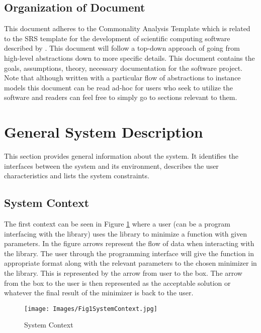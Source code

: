 \documentclass[12pt]{article}
\begin{document}
\subsection{Organization of Document}
This document adheres to the  Commonality Analysis Template which is related to the SRS template for the development of scientific computing software described by \citep{Ssmith}. This document will follow a top-down approach of going from high-level abstractions down to more specific details. This document contains the goals, assumptions, theory, necessary documentation for the software project. Note that although written with a particular flow of abstractions to instance models this document can be read ad-hoc for users who seek to utilize the software and readers can feel free to simply go to sections relevant to them. 
\\



\section{General System Description}
This section provides general information about the system.  It identifies the
interfaces between the system and its environment, describes the user
characteristics and lists the system constraints.
\\


\subsection{System Context}
The first context can be seen in Figure \ref{img:FigureSystemContext} where a user (can be a program interfacing with the library) uses the library to minimize a function with given parameters. In the figure arrows represent the flow of data when interacting with the library. The user through the programming interface will give the function in appropriate format along with the relevant parameters to the chosen minimizer in the library. This is represented by the arrow from user to the box. The arrow from the box to the user is then represented as the acceptable solution or whatever the final result of the minimizer is back to the user. 
\\


\begin{figure}[h!]
\begin{center}
 \texttt{[image: Images/Fig1SystemContext.jpg]}
\caption{System Context}
\label{img:FigureSystemContext}
\end{center}
\end{figure}
\end{document}
